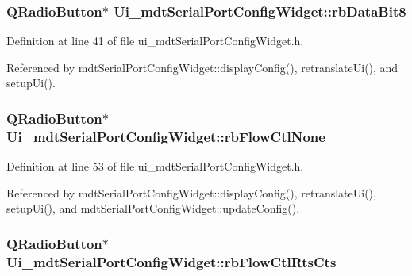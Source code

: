 \hypertarget{class_ui__mdt_serial_port_config_widget_a57cc2e4af17b1d557ad36e698be8a014}{
\subsubsection[{rb\-Data\-Bit8}]{\setlength{\rightskip}{0pt plus 5cm}Q\-Radio\-Button$\ast$ Ui\-\_\-mdt\-Serial\-Port\-Config\-Widget\-::rb\-Data\-Bit8}}\label{class_ui__mdt_serial_port_config_widget_a57cc2e4af17b1d557ad36e698be8a014}


Definition at line 41 of file ui\-\_\-mdt\-Serial\-Port\-Config\-Widget.\-h.



Referenced by mdt\-Serial\-Port\-Config\-Widget\-::display\-Config(), retranslate\-Ui(), and setup\-Ui().

\hypertarget{class_ui__mdt_serial_port_config_widget_abe0ae8729d84ec9649524eea1ebf0e4c}{
\subsubsection[{rb\-Flow\-Ctl\-None}]{\setlength{\rightskip}{0pt plus 5cm}Q\-Radio\-Button$\ast$ Ui\-\_\-mdt\-Serial\-Port\-Config\-Widget\-::rb\-Flow\-Ctl\-None}}\label{class_ui__mdt_serial_port_config_widget_abe0ae8729d84ec9649524eea1ebf0e4c}


Definition at line 53 of file ui\-\_\-mdt\-Serial\-Port\-Config\-Widget.\-h.



Referenced by mdt\-Serial\-Port\-Config\-Widget\-::display\-Config(), retranslate\-Ui(), setup\-Ui(), and mdt\-Serial\-Port\-Config\-Widget\-::update\-Config().

\hypertarget{class_ui__mdt_serial_port_config_widget_a51dd5f1afb25436fa0a7dc2c867fe316}{
\subsubsection[{rb\-Flow\-Ctl\-Rts\-Cts}]{\setlength{\rightskip}{0pt plus 5cm}Q\-Radio\-Button$\ast$ Ui\-\_\-mdt\-Serial\-Port\-Config\-Widget\-::rb\-Flow\-Ctl\-Rts\-Cts}}\label{class_ui__mdt_serial_port_config_widget_a51dd5f1afb25436fa0a7dc2c867fe316}


